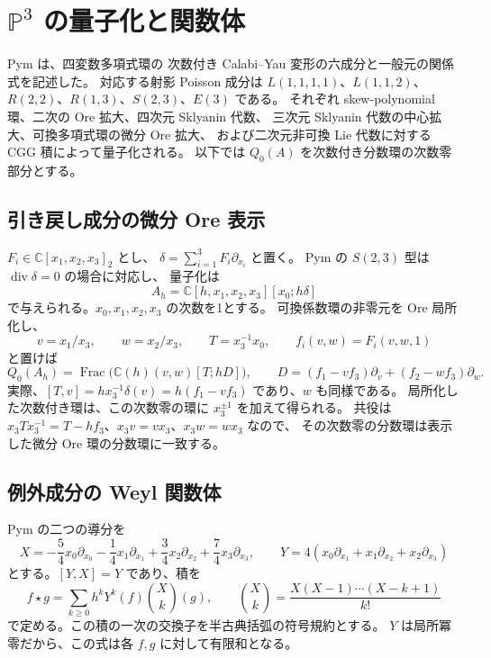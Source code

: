 \section{\texorpdfstring{$\mathbb P^3$}{P3} の量子化と関数体}
\label{sec:p3-quantum-models}\label{sec:p3-models}

Pym \cite[定理1.1、表1、第3節]{Pym2015} は、四変数多項式環の
次数付き Calabi--Yau 変形の六成分と一般元の関係式を記述した。
対応する射影 Poisson 成分は
$L(1,1,1,1)$、$L(1,1,2)$、$R(2,2)$、$R(1,3)$、$S(2,3)$、$E(3)$ である。
それぞれ skew-polynomial 環、二次の Ore 拡大、四次元 Sklyanin 代数、
三次元 Sklyanin 代数の中心拡大、可換多項式環の微分 Ore 拡大、
および二次元非可換 Lie 代数に対する CGG 積によって量子化される。
以下では $Q_0(A)$ を次数付き分数環の次数零部分とする。

\subsection{引き戻し成分の微分 Ore 表示}

$F_i\in\mathbb C[x_1,x_2,x_3]_2$ とし、
$\delta=\sum_{i=1}^3F_i\partial_{x_i}$ と置く。
Pym の $S(2,3)$ 型は $\operatorname{div}\delta=0$ の場合に対応し、
量子化は
\[
 A_h=\mathbb C[h,x_1,x_2,x_3][x_0;h\delta]
\]
で与えられる。$x_0,x_1,x_2,x_3$ の次数を1とする。
可換係数環の非零元を Ore 局所化し、
\[
 v=x_1/x_3,\qquad w=x_2/x_3,\qquad T=x_3^{-1}x_0,
 \qquad f_i(v,w)=F_i(v,w,1)
\]
と置けば
\[
 Q_0(A_h)=\operatorname{Frac}\bigl(\mathbb C(h)(v,w)[T;hD]\bigr),
 \qquad
 D=(f_1-vf_3)\partial_v+(f_2-wf_3)\partial_w.
\]
実際、$[T,v]=h x_3^{-1}\delta(v)=h(f_1-vf_3)$ であり、$w$ も同様である。
局所化した次数付き環は、この次数零の環に $x_3^{\pm1}$ を加えて得られる。
共役は $x_3Tx_3^{-1}=T-hf_3$、$x_3v=vx_3$、$x_3w=wx_3$ なので、
その次数零の分数環は表示した微分 Ore 環の分数環に一致する。

\subsection{例外成分の Weyl 関数体}
\label{subsec:exceptional-weyl}

Pym \cite[第3.6節、補題3.3]{Pym2015} の二つの導分を
\[
 X=-\frac54x_0\partial_{x_0}-\frac14x_1\partial_{x_1}
       +\frac34x_2\partial_{x_2}+\frac74x_3\partial_{x_3},
 \qquad
 Y=4(x_0\partial_{x_1}+x_1\partial_{x_2}+x_2\partial_{x_3})
\]
とする。$[Y,X]=Y$ であり、積を
\begin{equation}\label{eq:exceptional-cgg}
 f\star g=\sum_{k\ge0}h^kY^k(f)\binom{X}{k}(g),
 \qquad \binom Xk=\frac{X(X-1)\cdots(X-k+1)}{k!}
\end{equation}
で定める。この積の一次の交換子を半古典括弧の符号規約とする。
$Y$ は局所冪零だから、この式は各 $f,g$ に対して有限和となる。

